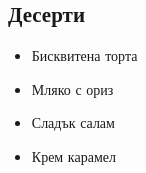 \documentclass{article}
\newenvironment{mylist}
{
  \begin{itemize}
  \setlength{\itemsep}{1pt}
  \setlength{\parskip}{0pt}
  \setlength{\parsep}{0pt}
}
{
\end{itemize}
}
\begin{document}
\begin{multicols}{2}
\section{Десерти}
\begin{mylist}
    \item{Бисквитена торта}
    \item{Мляко с ориз}
    \item{Сладък салам}
    \item{Крем карамел}
\end{mylist}
\end{multicols}
\end{document}
